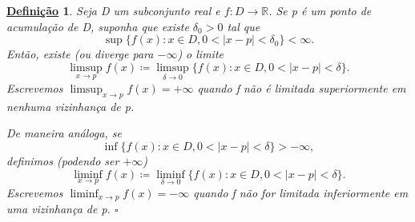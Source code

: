 \documentclass{article}
\newtheorem*{def*}{\underline{Defini\c c\~ao}}
\begin{document}
\begin{def*}
  Seja D um subconjunto real e $f:D\rightarrow \mathbb{R}$. Se p \'e um ponto de acumula\c c\~ao de D, suponha que existe $\delta_{0} > 0$
  tal que 
    $$
    \sup{\{f(x):x\in D, 0<|x-p|<\delta_{0}\}} < \infty.
    $$
    Ent\~ao, existe (ou diverge para $-\infty$) o limite 
      $$
      \limsup_{x\to p}f(x)\coloneqq \limsup_{\delta\to0}\{f(x):x\in D, 0<|x-p|<\delta\}.
      $$
      Escrevemos $\limsup_{x\to p}f(x) = +\infty$ quando f n\~ao \'e limitada superiormente em nenhuma vizinhan\c ca de p.

      De maneira an\'aloga, se 
        $$
        \inf{\{f(x):x\in D, 0<|x-p|<\delta\}} > -\infty,
        $$
      definimos (podendo ser $+\infty$) 
        $$
        \liminf_{x\to p}f(x)\coloneqq \liminf_{\delta\to0}\{f(x):x\in D, 0<|x-p|<\delta\}.
        $$
      Escrevemos $\liminf_{x\to p}f(x) = -\infty$ quando f n\~ao for limitada inferiormente em uma vizinhan\c ca de p. $\square$
\end{def*}
\end{document}

